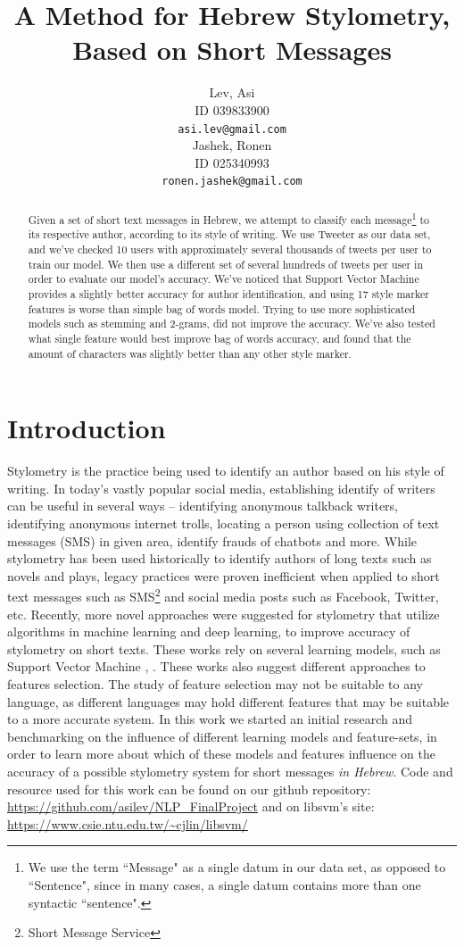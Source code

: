 \documentclass[a4paper]{article}
\author{Lev, Asi \\
	ID 039833900 \\
	{\tt asi.lev@gmail.com} \\
\And
	Jashek, Ronen\\
	ID 025340993\\
	{\tt ronen.jashek@gmail.com} \\	
}
\title{A Method for Hebrew Stylometry, Based on Short Messages}
\date{}
\begin{document}
\maketitle
\begin{abstract}

Given a set of short text messages in Hebrew, we attempt to classify each message\footnote{We use the term ``Message" as a single datum in our data set, as opposed to ``Sentence", since in many cases, a single datum contains more than one syntactic ``sentence".} to its respective author, according to its style of writing.
We use Tweeter as our data set, and we've checked 10 users with approximately several thousands of tweets per user to train our model.
We then use a different set of several hundreds of tweets per user in order to evaluate our model's accuracy.
We've noticed that Support Vector Machine provides a slightly better accuracy for author identification, and using 17 style marker features is worse than simple bag of words model. Trying to use more sophisticated models such as stemming and 2-grams, did not improve the accuracy. We've also tested what single feature would best improve bag of words accuracy, and found that the amount of characters was slightly better than any other style marker.
\end{abstract}
\section{Introduction}

Stylometry is the practice being used to identify an author based on his style of writing. In today's vastly popular social media, establishing identify of writers can be useful in several ways – identifying anonymous talkback writers, identifying anonymous internet trolls, locating a person using collection of text messages (SMS) in given area, identify frauds of chatbots and more.
While stylometry has been used historically to identify authors of long texts such as novels and plays, legacy practices were proven inefficient when applied to short text messages such as SMS\footnote{Short Message Service} and social media posts such as Facebook, Twitter, etc. \citep{green}
Recently, more novel approaches were suggested for stylometry that utilize algorithms in machine learning and deep learning, to improve accuracy of stylometry on short texts.
These works rely on several learning models, such as Support Vector Machine \citep{green}, \citep{schwartz}.
These works also suggest different approaches to features selection. The study of feature selection may not be suitable to any language, as different languages may hold different features that may be suitable to a more accurate system.
In this work we started an initial research and benchmarking on the influence of different learning models and feature-sets, in order to learn more about which of these models and features influence on the accuracy of a possible stylometry system for short messages \emph{in Hebrew}.
Code and resource used for this work can be found on our github repository: \url{https://github.com/asilev/NLP\_FinalProject} and on libsvm's site: \url{https://www.csie.ntu.edu.tw/~cjlin/libsvm/} \citep{chang}
\end{document}
